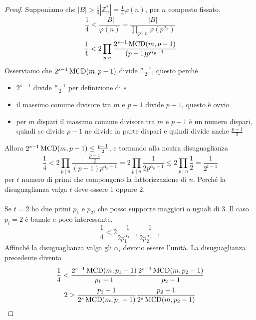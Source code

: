 \begin{proof}
	Supponiamo che $\left|B\right|>\frac{1}{4}\left|\mathbb{Z}_n^*\right|=\frac{1}{4}\varphi(n)$, per $n$ composto fissato. 
	\begin{equation*}
	\frac{1}{4}<\frac{\left|B\right|}{\varphi(n)}=\frac{\left|B\right|}{\prod_{p\mid n}\varphi\left(p^{\alpha_p}\right)}
	\end{equation*}
	\begin{equation*}
	\frac{1}{4}<2\prod_{p\mid n}\frac{2^{s-1}\operatorname{\mathrm{MCD}}(m,p-1)}{(p-1)p^{\alpha_p-1}}
	\end{equation*}
	Osserviamo che $2^{s-1}\operatorname{\mathrm{MCD}}(m,p-1)$ divide $\frac{p-1}{2}$, questo perché 
	\begin{itemize}
		\item $2^{s-1}$ divide $\frac{p-1}{2}$ per definizione di $s$
		\item il massimo comune divisore tra $m$ e $p-1$ divide $p-1$, questo è ovvio
		\item per $m$ dispari il massimo comune divisore tra $m$ e $p-1$ è un numero dispari, quindi se divide $p-1$ ne divide la parte dispari e quindi divide anche $\frac{p-1}{2}$
	\end{itemize}
	Allora $2^{s-1}\operatorname{\mathrm{MCD}}(m,p-1)\leq\frac{p-1}{2}$, e tornando alla nostra disuguaglianza
	\begin{equation*}
	\frac{1}{4}<2\prod_{p\mid n}\frac{\frac{p-1}{2}}{(p-1)p^{\alpha_p-1}}
	=2\prod_{p\mid n}\frac{1}{2p^{\alpha_p-1}}\leq2\prod_{p\mid n}\frac{1}{2}=\frac{1}{2^{t-1}}
	\end{equation*}
	per $t$ numero di primi che compongono la fattorizzazione di $n$. Perché la disuguaglianza valga $t$ deve essere 1 oppure 2. \\ \\ Se $t=2$ ho due primi $p_1$ e $p_2$, che posso supporre maggiori o uguali di 3. Il caso $p_i=2$ è banale e poco interessante.
	\begin{equation*}
	\frac{1}{4}<2\frac{1}{2p_1^{\alpha_1-1}}\frac{1}{2p_2^{\alpha_2-1}}
	\end{equation*}
	Affinché la disuguaglianza valga gli $\alpha_i$ devono essere l'unità. La disuguaglianza precedente diventa
	\begin{equation*}
	\frac{1}{4}<\frac{2^{s-1}\operatorname{\mathrm{MCD}}(m,p_1-1)}{p_1-1}\frac{2^{s-1}\operatorname{\mathrm{MCD}}(m,p_2-1)}{p_2-1}
	\end{equation*}
	\begin{equation*}
	2>\frac{p_1-1}{2^s\operatorname{\mathrm{MCD}}(m,p_1-1)}\frac{p_2-1}{2^s\operatorname{\mathrm{MCD}}(m,p_2-1)}
	\end{equation*}

\end{proof}
